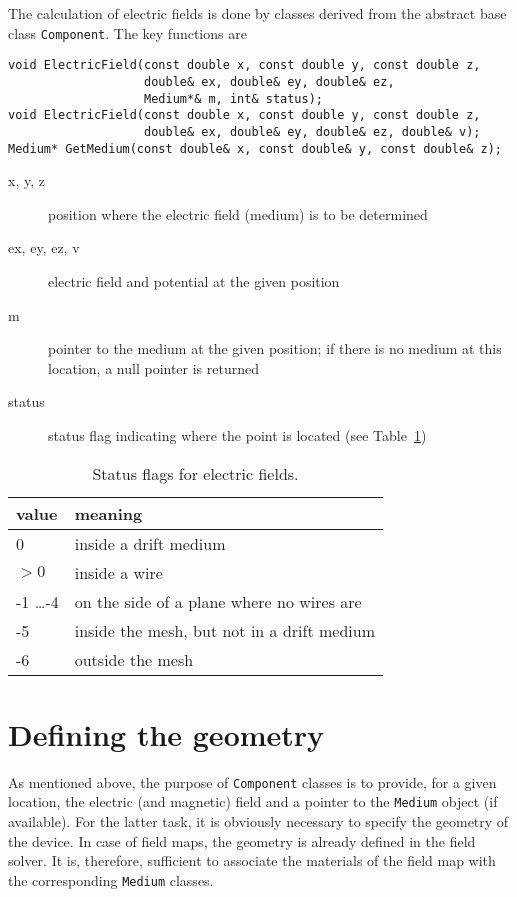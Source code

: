 The calculation of electric fields is done by classes 
derived from the abstract base class \texttt{Component}. 
The key functions are 
\begin{lstlisting}
void ElectricField(const double x, const double y, const double z,
                   double& ex, double& ey, double& ez,
                   Medium*& m, int& status);
void ElectricField(const double x, const double y, const double z,
                   double& ex, double& ey, double& ez, double& v);
Medium* GetMedium(const double& x, const double& y, const double& z);
\end{lstlisting}
\begin{description}
  \item[x, y, z] 
  position where the electric field (medium) is to be determined
  \item[ex, ey, ez, v] 
  electric field and potential at the given position
  \item[m] pointer to the medium at the given position; 
  if there is no medium at this location, a null pointer is returned
  \item[status] status flag indicating where the point is located
  (see Table~\ref{Tab:StatusFlagsField})
\end{description}

\begin{table} 
  \centering
  \caption{Status flags for electric fields.}
  \label{Tab:StatusFlagsField}
  \begin{tabular}{l l}
  \toprule
  value & meaning \\
  \midrule
    0   & inside a drift medium \\
  \(> 0\) & inside a wire \\
   -1 \dots -4  &  on the side of a plane where no wires are \\
   -5   & inside the mesh, but not in a drift medium \\
   -6   & outside the mesh \\
  \bottomrule
  \end{tabular}
\end{table}

\section{Defining the geometry}

As mentioned above, the purpose of \texttt{Component} classes is to 
provide, for a given location, the electric (and magnetic) field and a pointer to the 
\texttt{Medium} object (if available).
For the latter task, it is obviously necessary to specify the geometry 
of the device. 
In case of field maps, the geometry is already defined in the field solver. 
It is, therefore, sufficient to associate the materials 
of the field map with the corresponding \texttt{Medium} classes. 


